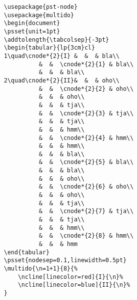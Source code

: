 \documentclass[a4paper]{article}
\begin{document}
\bigskip
\begin{verbatim}
\usepackage{pst-node}
\usepackage{multido}
\begin{document}
\psset{unit=1pt}
\addtolength{\tabcolsep}{-3pt}
\begin{tabular}{lp{3cm}cl}
1\quad\cnode*{2}{I} &  &  & bla\\
          &  &  \cnode*{2}{1} & bla\\
          &  &  & bla\\
2\quad\cnode*{2}{II}&  &  & oho\\
          &  &  \cnode*{2}{2} & oho\\
          &  &  & oho\\
          &  &  & tja\\
          &  &  \cnode*{2}{3} & tja\\
          &  &  & tja\\
          &  &  & hmm\\
          &  &  \cnode*{2}{4} & hmm\\
          &  &  & hmm\\
          &  &  & bla\\
          &  &  \cnode*{2}{5} & bla\\
          &  &  & bla\\
          &  &  & oho\\
          &  &  \cnode*{2}{6} & oho\\
          &  &  & oho\\
          &  &  & tja\\
          &  &  \cnode*{2}{7} & tja\\
          &  &  & tja\\
          &  &  & hmm\\
          &  &  \cnode*{2}{8} & hmm\\
          &  &  & hmm
\end{tabular}
\psset{nodesep=0.1,linewidth=0.5pt}
\multido{\n=1+1}{8}{%
    \ncline[linecolor=red]{I}{\n}%
    \ncline[linecolor=blue]{II}{\n}%
}
\end{verbatim}
\end{document}
